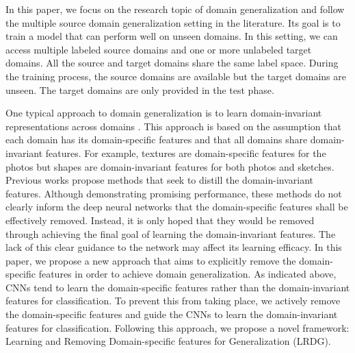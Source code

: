\documentclass{article}
\begin{document}
In this paper, we focus on the research topic of domain generalization and follow the multiple source domain generalization setting in the literature. Its goal is to train a model that can perform well on unseen domains. In this setting, we can access multiple labeled source domains and one or more unlabeled target domains. All the source and target domains share the same label space. During the training process, the source domains are available but the target domains are unseen. The target domains are only provided in the test phase.

One typical approach to domain generalization is to learn domain-invariant representations across domains \cite{ghifary2015domain,li2018deep,wang2019learningproject,arjovsky2019invariant,chattopadhyay2020learning,du2020learning,zhao2020domain,mahajan2021domain,rame2022fishr}. This approach is based on the assumption that each domain has its domain-specific features and that all domains share domain-invariant features. For example, textures are domain-specific features for the photos but shapes are domain-invariant features for both photos and sketches. Previous works propose methods that seek to distill the domain-invariant features. Although demonstrating promising performance, these methods do not clearly inform the deep neural networks that the domain-specific features shall be effectively removed. Instead, it is only hoped that they would be removed through achieving the final goal of learning the domain-invariant features. The lack of this clear guidance to the network may affect its learning efficacy. In this paper, we propose a new approach that aims to explicitly remove the domain-specific features in order to achieve domain generalization. As indicated above, CNNs tend to learn the domain-specific features rather than the domain-invariant features for classification. To prevent this from taking place, we actively remove the domain-specific features and guide the CNNs to learn the domain-invariant features for classification. Following this approach, we propose a novel framework: Learning and Removing Domain-specific features for Generalization (LRDG).
\end{document}
